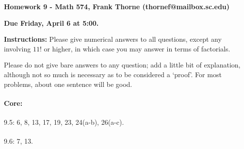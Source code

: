 \documentclass[12pt]{amsart}
\begin{document}
\setlength{\topmargin}{-2mm}





\begin{center}{\bf Homework 9 - Math 574, Frank Thorne (thornef@mailbox.sc.edu)}
\end{center}
\begin{center}
{\bf Due Friday, April 6 at 5:00.}
\end{center}
{\bf Instructions:} Please give numerical answers to all questions, except any involving $11!$
or higher, in which case you may answer in terms of factorials.

Please do not give bare answers to any question; add a little bit of explanation, although not so
much is necessary as to be considered a `proof'. For most problems, about one sentence will be good.
\\
\\
{\bf Core:}
\\
\\
9.5: 6, 8, 13, 17, 19, 23, 24(a-b), 26(a-c).
\\
\\
9.6: 7, 13.
\\
\\
\end{document}
